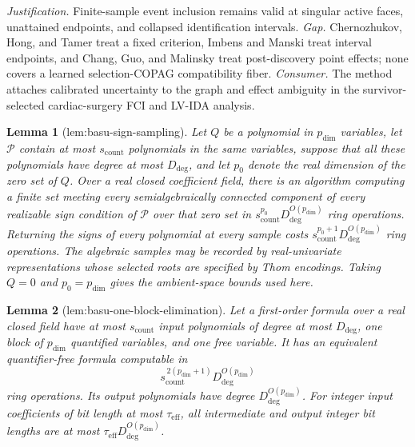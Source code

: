 \documentclass{article}
\newtheorem{lemma}{Lemma}
\begin{document}
\par\smallskip\noindent \textit{Justification.} Finite-sample event inclusion remains valid at singular active faces, unattained endpoints, and collapsed identification intervals. \textit{Gap.} Chernozhukov, Hong, and Tamer treat a fixed criterion, Imbens and Manski treat interval endpoints, and Chang, Guo, and Malinsky treat post-discovery point effects; none covers a learned selection-COPAG compatibility fiber. \textit{Consumer.} The method attaches calibrated uncertainty to the graph and effect ambiguity in the survivor-selected cardiac-surgery FCI and LV-IDA analysis.

\begin{lemma}[lem:basu-sign-sampling]\label{lem:basu-sign-sampling}
Let \(Q\) be a polynomial in \(p_{\mathrm{dim}}\) variables, let \(\mathscr P\) contain at most \(s_{\mathrm{count}}\) polynomials in the same variables, suppose that all these polynomials have degree at most \(D_{\mathrm{deg}}\), and let \(p_0\) denote the real dimension of the zero set of \(Q\).  Over a real closed coefficient field, there is an algorithm computing a finite set meeting every semialgebraically connected component of every realizable sign condition of \(\mathscr P\) over that zero set in \(s_{\mathrm{count}}^{p_0}D_{\mathrm{deg}}^{O(p_{\mathrm{dim}})}\) ring operations.  Returning the signs of every polynomial at every sample costs \(s_{\mathrm{count}}^{p_0+1}D_{\mathrm{deg}}^{O(p_{\mathrm{dim}})}\) ring operations.  The algebraic samples may be recorded by real-univariate representations whose selected roots are specified by Thom encodings.  Taking \(Q=0\) and \(p_0=p_{\mathrm{dim}}\) gives the ambient-space bounds used here.
\end{lemma}

\begin{lemma}[lem:basu-one-block-elimination]\label{lem:basu-one-block-elimination}
Let a first-order formula over a real closed field have at most \(s_{\mathrm{count}}\) input polynomials of degree at most \(D_{\mathrm{deg}}\), one block of \(p_{\mathrm{dim}}\) quantified variables, and one free variable.  It has an equivalent quantifier-free formula computable in
\[
s_{\mathrm{count}}^{\,2(p_{\mathrm{dim}}+1)}D_{\mathrm{deg}}^{O(p_{\mathrm{dim}})}
\]
ring operations.  Its output polynomials have degree \(D_{\mathrm{deg}}^{O(p_{\mathrm{dim}})}\).  For integer input coefficients of bit length at most \(\tau_{\mathrm{eff}}\), all intermediate and output integer bit lengths are at most \(\tau_{\mathrm{eff}}D_{\mathrm{deg}}^{O(p_{\mathrm{dim}})}\).
\end{lemma}
\end{document}
